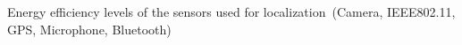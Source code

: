 Energy efficiency levels of the sensors used for localization\ (Camera, IEEE802.11, GPS, Microphone, Bluetooth) 
